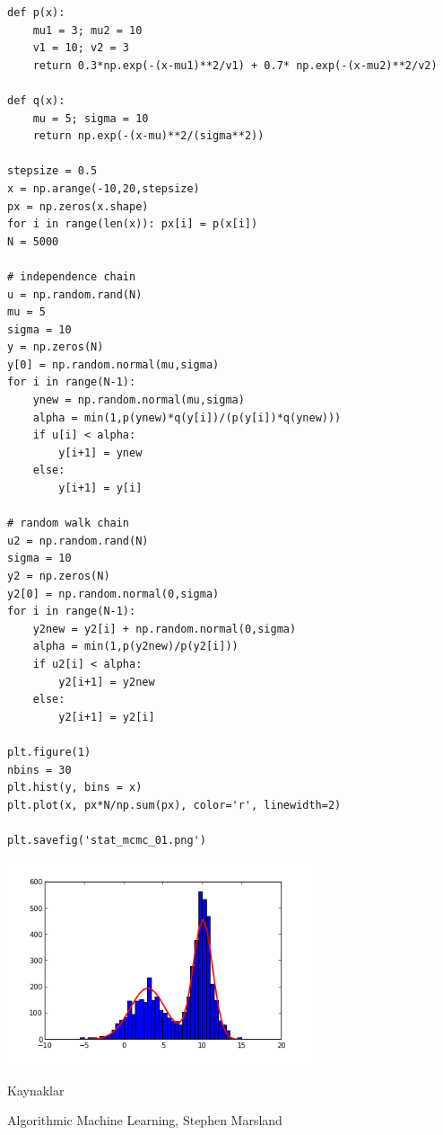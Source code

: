 \documentclass[12pt,fleqn]{article}\usepackage{../common}
\begin{document}
\begin{verbatim}
def p(x):
    mu1 = 3; mu2 = 10
    v1 = 10; v2 = 3
    return 0.3*np.exp(-(x-mu1)**2/v1) + 0.7* np.exp(-(x-mu2)**2/v2)

def q(x):
    mu = 5; sigma = 10
    return np.exp(-(x-mu)**2/(sigma**2))

stepsize = 0.5
x = np.arange(-10,20,stepsize)
px = np.zeros(x.shape)
for i in range(len(x)): px[i] = p(x[i])
N = 5000

# independence chain
u = np.random.rand(N)
mu = 5
sigma = 10
y = np.zeros(N)
y[0] = np.random.normal(mu,sigma)
for i in range(N-1):
    ynew = np.random.normal(mu,sigma)
    alpha = min(1,p(ynew)*q(y[i])/(p(y[i])*q(ynew)))
    if u[i] < alpha:
        y[i+1] = ynew
    else:
        y[i+1] = y[i]

# random walk chain
u2 = np.random.rand(N)
sigma = 10
y2 = np.zeros(N)
y2[0] = np.random.normal(0,sigma)
for i in range(N-1):
    y2new = y2[i] + np.random.normal(0,sigma)
    alpha = min(1,p(y2new)/p(y2[i]))
    if u2[i] < alpha:
        y2[i+1] = y2new
    else:
        y2[i+1] = y2[i]

plt.figure(1)
nbins = 30
plt.hist(y, bins = x)
plt.plot(x, px*N/np.sum(px), color='r', linewidth=2)

plt.savefig('stat_mcmc_01.png')
\end{verbatim}

\includegraphics[height=6cm]{stat_mcmc_01.png}


Kaynaklar

Algorithmic Machine Learning, Stephen Marsland
\end{document}
